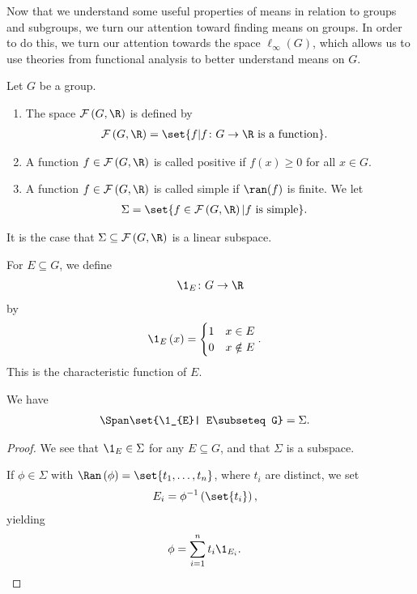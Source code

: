 Now that we understand some useful properties of means in relation to groups and subgroups, we turn our attention toward finding means on groups. In order to do this, we turn our attention towards the space $\ell_{\infty}\left(G\right)$, which allows us to use theories from functional analysis to better understand means on $G$.
\begin{definition}
  Let $G$ be a group.
  \begin{enumerate}[(1)]
    \item The space $\mathcal{F}\left(G,\R\right)$ is defined by
      \begin{align*}
        \mathcal{F}\left(G,\R\right) &= \set{f | f\colon G\rightarrow \R\text{ is a function}}.
      \end{align*}
    \item A function $f\in \mathcal{F}\left(G,\R\right)$ is called positive if $f(x) \geq 0$ for all $x\in G$.
    \item A function $f\in \mathcal{F}\left(G,\R\right)$ is called simple if $\ran(f)$ is finite. We let
      \begin{align*}
        \Sigma &= \set{f\in \mathcal{F}\left(G,\R\right) | f\text{ is simple}}.
      \end{align*}
  \end{enumerate}
\end{definition}
\begin{fact}
  It is the case that $\Sigma \subseteq \mathcal{F}\left(G,\R\right)$ is a linear subspace.
\end{fact}
\begin{definition}
  For $E\subseteq G$, we define
  \begin{align*}
    \1_{E}\colon G\rightarrow \R
  \end{align*}
  by
  \begin{align*}
    \1_{E}\left(x\right) &= \begin{cases}
      1 & x\in E\\
      0 & x\notin E
    \end{cases}.
  \end{align*}
  This is the characteristic function of $E$.
\end{definition}
\begin{fact}
  We have
  \begin{align*}
    \Span\set{\1_{E}| E\subseteq G} &= \Sigma.
  \end{align*}
\end{fact}
\begin{proof}
  We see that $\1_{E}\in \Sigma$ for any $E\subseteq G$, and that $\Sigma$ is a subspace.\newline

  If $\phi\in \Sigma$ with $\Ran\left(\phi\right) = \set{t_1,\dots,t_n}$, where $t_i$ are distinct, we set
  \begin{align*}
    E_i &= \phi^{-1}\left(\set{t_i}\right),
  \end{align*}
  yielding
  \begin{align*}
    \phi &= \sum_{i=1}^{n}t_i\1_{E_i}.
  \end{align*}
\end{proof}
